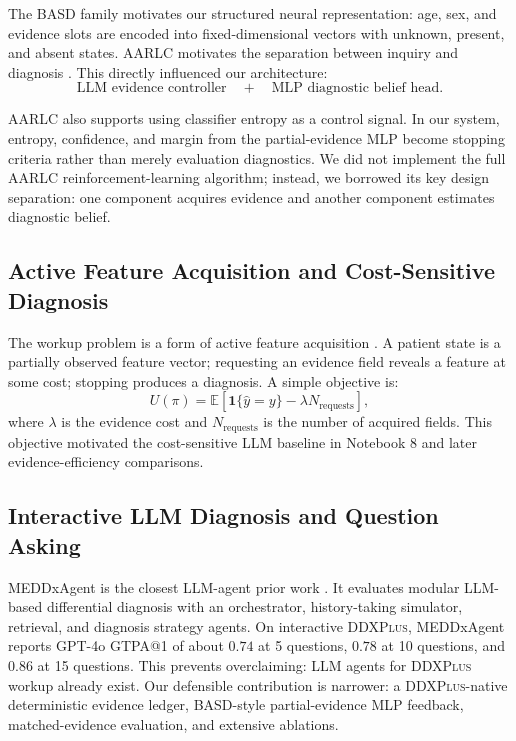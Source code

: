 \documentclass[11pt]{article}
\newcommand{\ddx}{\textsc{DDXPlus}}
\newcommand{\mlp}{\textsc{MLP}}
\newcommand{\llm}{\textsc{LLM}}
\begin{document}
The BASD family motivates our structured neural representation: age, sex, and evidence slots are encoded into fixed-dimensional vectors with unknown, present, and absent states. AARLC motivates the separation between inquiry and diagnosis \cite{aarlc}. This directly influenced our architecture:
\[
\text{LLM evidence controller} \quad + \quad \text{MLP diagnostic belief head}.
\]

AARLC also supports using classifier entropy as a control signal. In our system, entropy, confidence, and margin from the partial-evidence \mlp{} become stopping criteria rather than merely evaluation diagnostics. We did not implement the full AARLC reinforcement-learning algorithm; instead, we borrowed its key design separation: one component acquires evidence and another component estimates diagnostic belief.

\subsection{Active Feature Acquisition and Cost-Sensitive Diagnosis}

The workup problem is a form of active feature acquisition \cite{afa,costsensitive}. A patient state is a partially observed feature vector; requesting an evidence field reveals a feature at some cost; stopping produces a diagnosis. A simple objective is:
\[
U(\pi) = \mathbb{E}\left[\mathbf{1}\{\hat{y}=y\} - \lambda N_{\text{requests}}\right],
\]
where $\lambda$ is the evidence cost and $N_{\text{requests}}$ is the number of acquired fields. This objective motivated the cost-sensitive \llm{} baseline in Notebook 8 and later evidence-efficiency comparisons.

\subsection{Interactive LLM Diagnosis and Question Asking}

MEDDxAgent is the closest LLM-agent prior work \cite{meddxagent}. It evaluates modular LLM-based differential diagnosis with an orchestrator, history-taking simulator, retrieval, and diagnosis strategy agents. On interactive \ddx{}, MEDDxAgent reports GPT-4o GTPA@1 of about $0.74$ at 5 questions, $0.78$ at 10 questions, and $0.86$ at 15 questions. This prevents overclaiming: LLM agents for \ddx{} workup already exist. Our defensible contribution is narrower: a \ddx{}-native deterministic evidence ledger, BASD-style partial-evidence \mlp{} feedback, matched-evidence evaluation, and extensive ablations.
\end{document}
